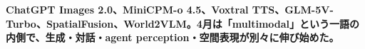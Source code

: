 \noindent\textbf{ChatGPT Images 2.0、MiniCPM-o 4.5、Voxtral TTS、GLM-5V-Turbo、SpatialFusion、World2VLM。4月は「multimodal」という一語の内側で、生成・対話・agent perception・空間表現が別々に伸び始めた。}\autocite{src-0f697d747d9c,src-d113b486a585,src-d33ba68aac3c,src-d8b7c1c36830}
